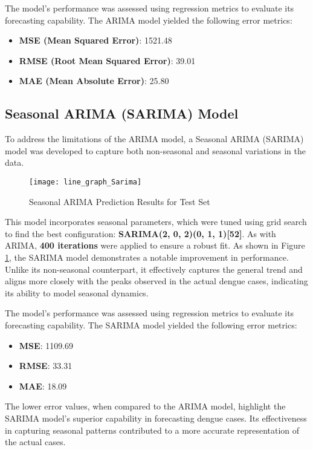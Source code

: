 The model's performance was assessed using regression metrics to evaluate its forecasting capability. The ARIMA model yielded the following error metrics:

\begin{itemize}
	\item \textbf{MSE (Mean Squared Error)}: 1521.48
	\item \textbf{RMSE (Root Mean Squared Error)}: 39.01
	\item \textbf{MAE (Mean Absolute Error)}: 25.80
\end{itemize}

\subsection{Seasonal ARIMA (SARIMA) Model}

To address the limitations of the ARIMA model, a Seasonal ARIMA (SARIMA) model was developed to capture both non-seasonal and seasonal variations in the data.

\begin{figure}[H]
	\centering
	\texttt{[image: line\_graph\_Sarima]}
	\caption{Seasonal ARIMA Prediction Results for Test Set}
	\label{fig:Sarima_result}
\end{figure}

This model incorporates seasonal parameters, which were tuned using grid search to find the best configuration: \textbf{SARIMA(2, 0, 2)(0, 1, 1)[52]}. As with ARIMA, \textbf{400 iterations} were applied to ensure a robust fit. As shown in Figure \ref{fig:Sarima_result}, the SARIMA model demonstrates a notable improvement in performance. Unlike its non-seasonal counterpart, it effectively captures the general trend and aligns more closely with the peaks observed in the actual dengue cases, indicating its ability to model seasonal dynamics.

The model's performance was assessed using regression metrics to evaluate its forecasting capability. The SARIMA model yielded the following error metrics: \begin{itemize} \item \textbf{MSE}: 1109.69 \item \textbf{RMSE}: 33.31 \item \textbf{MAE}: 18.09 \end{itemize} The lower error values, when compared to the ARIMA model, highlight the SARIMA model's superior capability in forecasting dengue cases. Its effectiveness in capturing seasonal patterns contributed to a more accurate representation of the actual cases.

